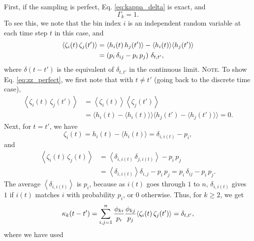 \documentclass[reprint, floatfix]{revtex4-1}
\newcommand{\note}[1]{{\color{DarkGreen}\footnotesize \textsc{Note.} #1}}
\begin{document}
First, if the sampling is perfect,
Eq. \eqref{eq:kappa_delta} is exact, and
%
\begin{equation}
  \Gamma_k = 1.
\label{eq:Gamma_perfect}
\end{equation}
%
To see this, we note that
the bin index $i$ is an independent random variable
at each time step $t$ in this case, and
%
\begin{align}
  \left\langle
    \zeta_i(t) \, \zeta_j(t')
  \right\rangle
  &=
  \langle h_i(t) \, h_j(t') \rangle
  -
  \langle h_i(t) \rangle
  \langle h_j(t') \rangle
  \notag
  \\
  &=
  \left( p_i \, \delta_{ij} - p_i \, p_j \right) \,
  \delta_{t, t'}
  ,
\label{eq:zz_perfect}
\end{align}
%
where $\delta(t - t')$ is the equivalent of $\delta_{t, t'}$
in the continuous limit.
%
\note{To show Eq. \eqref{eq:zz_perfect}, we first note that
  with $t \ne t'$ (going back to the discrete time case),
  $$
  \begin{aligned}
  \left\langle
    \zeta_i(t) \, \zeta_j(t')
  \right\rangle
  &=
  \left\langle
    \zeta_i(t)
  \right\rangle
  \left\langle
    \zeta_j(t')
  \right\rangle
  \\
  &=
  \bigl\langle h_i(t)  - \langle h_i(t)  \rangle \bigr\rangle
  \bigl\langle h_j(t') - \langle h_j(t') \rangle \bigr\rangle
  =
  0.
  \end{aligned}
  $$
  Next, for $t = t'$, we have
  $$
  \zeta_i(t)
  = h_i(t) - \langle h_i(t) \rangle
  = \delta_{i, i(t)} - p_i,
  $$
  and
  $$
  \begin{aligned}
  \left\langle
    \zeta_i(t) \, \zeta_j(t)
  \right\rangle
  &=
  \left\langle
    \delta_{i, i(t)} \, \delta_{j, i(t)}
  \right\rangle
  -
  p_i \, p_j
  \\
  &=
  \left\langle
    \delta_{i, i(t)}
  \right\rangle
  \delta_{i, j}
  -
  p_i \, p_j
  =
  p_i \, \delta_{ij}
  - p_i \, p_j.
  \end{aligned}
  $$
  The average
  $\left\langle \delta_{i, i(t)} \right\rangle$ is $p_i$,
  because as $i(t)$ goes through $1$ to $n$,
  $\delta_{i, i(t)}$ gives $1$
  if $i(t)$ matches $i$ with probability $p_i$,
  or $0$ otherwise.
}
%
Thus,
for $k \ge 2$, we get
%
\begin{equation}
  \kappa_k(t - t')
  =
  \sum_{i,j = 1}^n
  \frac{ \phi_{ki} } { p_i }
  \frac{ \phi_{kj} } { p_j }
  \langle \zeta_i(t) \, \zeta_j(t') \rangle
  = \delta_{t, t'},
\notag
\end{equation}
%
where we have used
\end{document}
